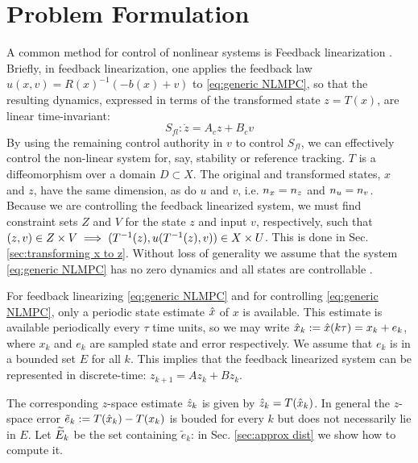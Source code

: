 \section{Problem Formulation} 
\label{sec:formulation}
A common method for control of nonlinear systems is Feedback linearization \cite{khalil}. 
Briefly, in feedback linearization, one applies the feedback law $u(x,v) = R(x)^{-1}(-b(x)+v)$ to \eqref{eq:generic NLMPC}, so that the resulting dynamics, expressed in terms of the transformed state $z = T(x)$, are linear time-invariant:
\begin{equation}
\label{eq:LTI_fb_lin}
S_{fl}: \dot{z} = A_cz + B_cv
\end{equation}
By using the remaining control authority in $v$ to control $S_{fl}$, we can effectively control the non-linear system for, say, stability or reference tracking.
$T$ is a diffeomorphism over a domain $D \subset X$.
The original and transformed states, $x$ and $z$, have the same dimension, as do $u$ and $v$, i.e. $n_x = n_z$ and $n_u = n_v$.
Because we are controlling the feedback linearized system, we must find constraint sets $Z$ and $V$ for the state $z$ and input $v$, respectively, such that $(z,v) \in Z\times V \implies (T^{-1}(z), u(T^{-1}(z), v)) \in X \times U$.
This is done in Sec. \ref{sec:transforming x to z}.
Without loss of generality we assume that the system \eqref{eq:generic NLMPC} has no zero dynamics and all states are controllable \cite{khalil}. 

For feedback linearizing \eqref{eq:generic NLMPC} and for controlling \eqref{eq:generic NLMPC}, only a periodic state estimate $\hat{x}$ of $x$ is available.
This estimate is available periodically every $\tau$ time units, so we may write $\hat{x}_{k} := \hat{x}(k\tau) = x_k + e_k$, where $x_k$ and $e_k$ are sampled state and error respectively.
We assume that $e_k$ is in a bounded set $E$ for all $k$.
This implies that the feedback linearized system can be represented in discrete-time: $z_{k+1} = Az_k + B z_k$.

The corresponding $z$-space estimate $\hat{z}_{k}$ is given by $\hat{z}_{k} = T(\hat{x}_{k})$.
In general the $z$-space error $\tilde{e}_k := T(\hat{x}_k) - T(x_k)$ is bouded for every $k$ but does not necessarily lie in $E$.
Let $\widetilde{E}_{k}$ be the set containing $\tilde{e}_k$: in Sec. \ref{sec:approx dist} we show how to compute it.

